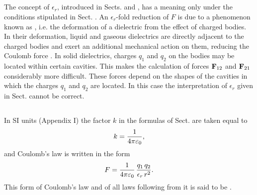 \subsection{}\label{14.2.6} The concept of $\epsilon_{r}$, introduced in Sects.  and , has a meaning only under the conditions stipulated in Sect. . An $\epsilon_{r}$-fold reduction of $F$ is due to a phenomenon known as , i.e. the deformation of a dielectric  from the effect of charged bodies. In their deformation, liquid and gaseous dielectrics are directly adjacent to the charged bodies and exert an additional mechanical action on them, reducing the Coulomb force . In solid dielectrics, charges $q_{1}$ and $q_{2}$ on the bodies may be located within certain cavities. This makes the calculation of forces $\vb{F}_{12}$ and $\vb{F}_{21}$  considerably more difficult. These forces depend on the shapes of the cavities in which the charges $q_{1}$ and $q_{2}$ are located. In this case the interpretation of $\epsilon_{r}$ given in Sect.  cannot be correct.

\subsection{}\label{14.2.7} In SI units (Appendix I) the factor $k$ in the formulas of Sect.  are taken equal to
\begin{equation*}%
k = \frac{1}{\fpe},
\end{equation*}
and Coulomb's law is written in the form
\begin{equation*}%
F = \frac{1}{\fpe} \, \frac{q_{1}\,q_{2}}{\epsilon_{r} \, r^{2}}.
\end{equation*}
This form of Coulomb's law and of all laws following from it is said to be .

